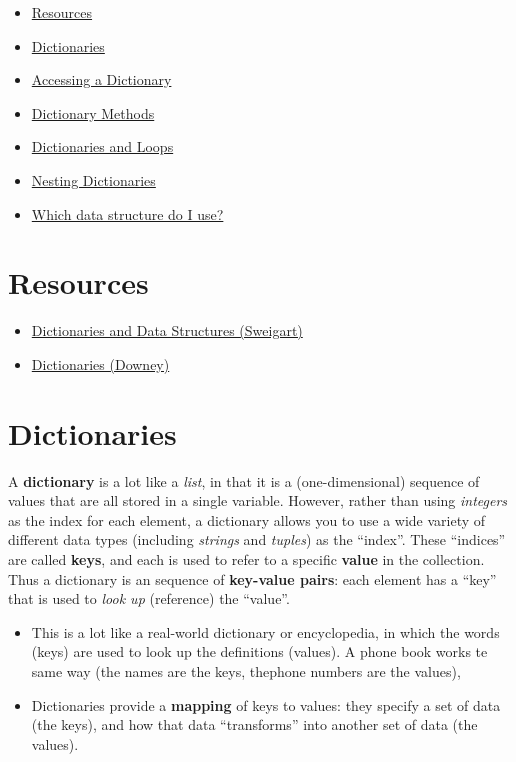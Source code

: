 \documentclass[]{book}
\providecommand{\tightlist}{%
  \setlength{\itemsep}{0pt}\setlength{\parskip}{0pt}}
\begin{document}
\begin{itemize}
\tightlist
\item
  \protect\hyperlink{resources}{Resources}
\item
  \protect\hyperlink{dictionaries}{Dictionaries}
\item
  \protect\hyperlink{accessing-a-dictionary}{Accessing a Dictionary}
\item
  \protect\hyperlink{dictionary-methods}{Dictionary Methods}
\item
  \protect\hyperlink{dictionaries-and-loops}{Dictionaries and Loops}
\item
  \protect\hyperlink{nesting-dictionaries}{Nesting Dictionaries}
\item
  \protect\hyperlink{which-data-structure-do-i-use}{Which data structure
  do I use?}
\end{itemize}

\section{Resources}\label{resources-4}

\begin{itemize}
\tightlist
\item
  \href{https://automatetheboringstuff.com/chapter5/}{Dictionaries and
  Data Structures (Sweigart)}
\item
  \href{https://books.trinket.io/pfe/09-dictionaries.html}{Dictionaries
  (Downey)}
\end{itemize}

\section{Dictionaries}\label{dictionaries-1}

A \textbf{dictionary} is a lot like a \emph{list}, in that it is a
(one-dimensional) sequence of values that are all stored in a single
variable. However, rather than using \emph{integers} as the index for
each element, a dictionary allows you to use a wide variety of different
data types (including \emph{strings} and \emph{tuples}) as the
``index''. These ``indices'' are called \textbf{keys}, and each is used
to refer to a specific \textbf{value} in the collection. Thus a
dictionary is an sequence of \textbf{key-value pairs}: each element has
a ``key'' that is used to \emph{look up} (reference) the ``value''.

\begin{itemize}
\item
  This is a lot like a real-world dictionary or encyclopedia, in which
  the words (keys) are used to look up the definitions (values). A phone
  book works te same way (the names are the keys, thephone numbers are
  the values),
\item
  Dictionaries provide a \textbf{mapping} of keys to values: they
  specify a set of data (the keys), and how that data ``transforms''
  into another set of data (the values).
\end{itemize}
\end{document}

